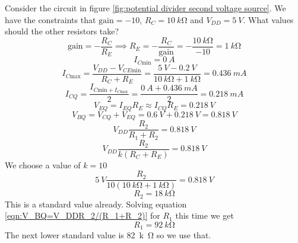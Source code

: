 \documentclass{article}
\begin{document}
    \example
    Consider the circuit in figure \ref{fig:potential divider second voltage source}.
    We have the constraints that \(\text{gain} = -10\), \(R_C = \SI{10}{k\ohm}\) and \(V_{DD} = \SI{5}{V}\).
    What values should the other resistors take?
    \[\text{gain} = -\frac{R_C}{R_E}\implies R_E = -\frac{R_C}{\text{gain}} = -\frac{\SI{10}{k\ohm}}{-10} = \SI{1}{k\ohm}\]
    \[I_{C\text{min}} = \SI{0}{A}\]
    \[I_{C\text{max}} = \frac{V_{DD} - V_{CE\text{min}}}{R_C + R_E} = \frac{\SI{5}{V} - \SI{0.2}{V}}{\SI{10}{k\ohm} + \SI{1}{k\ohm}} = \SI{0.436}{mA}\]
    \[I_{CQ} = \frac{I_{C\text{min} + I_{C\text{max}}}}{2} = \frac{\SI{0}{A} + \SI{0.436}{mA}}{2} = \SI{0.218}{mA}\]
    \[V_{EQ} = I_{EQ}R_E\approx I_{CQ}R_E = \SI{0.218}{V}\]
    \[V_{BQ} = V_{CQ} + V_{EQ} = \SI{0.6}{V} + \SI{0.218}{V} = \SI{0.818}{V}\]
    \[V_{DD}\frac{R_2}{R_1 + R_2} = \SI{0.818}{V}\]
    \[V_{DD}\frac{R_2}{k(R_C + R_E)} = \SI{0.818}{V}\]
    We choose a value of \(k = 10\)
    \[\SI{5}{V}\frac{R_2}{10(\SI{10}{k\ohm} + \SI{1}{k\ohm})} = \SI{0.818}{V}\]
    \[R_2 = \SI{18}{k\ohm}\]
    This is a standard value already.
    Solving equation \ref{eqn:V_BQ=V_DDR_2/(R_1+R_2)} for \(R_1\) this time we get
    \[R_1 = \SI{92}{k\ohm}\]
    The next lower standard value is \SI{82}{k\ohm} so we use that.
    
\end{document}
